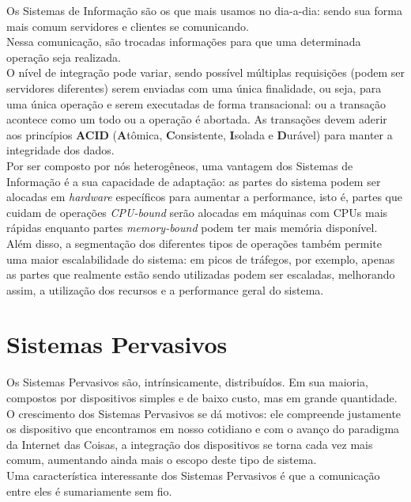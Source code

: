 \documentclass{article}
\begin{document}
Os Sistemas de Informação são os que mais usamos no dia-a-dia: sendo sua forma mais comum servidores e clientes se comunicando.\\
Nessa comunicação, são trocadas informações para que uma determinada operação seja realizada.\\
O nível de integração pode variar, sendo possível múltiplas requisições (podem ser servidores diferentes) serem enviadas com uma única finalidade, ou seja, para uma única operação e serem executadas de forma transacional: ou a transação acontece como um todo ou a operação é abortada.
As transações devem aderir aos princípios \textbf{ACID} (\textbf{A}tômica, \textbf{C}onsistente, \textbf{I}solada e \textbf{D}urável) para manter a integridade dos dados.\\
Por ser composto por nós heterogêneos, uma vantagem dos Sistemas de Informação é a sua capacidade de adaptação: as partes do sistema podem ser alocadas em \textit{hardware} específicos para aumentar a performance, isto é, partes que cuidam de operações \textit{CPU-bound} serão alocadas em máquinas com CPUs mais rápidas enquanto partes \textit{memory-bound} podem ter mais memória disponível. Além disso, a segmentação dos diferentes tipos de operações também permite uma maior escalabilidade do sistema: em picos de tráfegos, por exemplo, apenas as partes que realmente estão sendo utilizadas podem ser escaladas, melhorando assim, a utilização dos recursos e a performance geral do sistema.

\section{Sistemas Pervasivos}

Os Sistemas Pervasivos são, intrínsicamente, distribuídos. Em sua maioria, compostos por dispositivos simples e de baixo custo, mas em grande quantidade.\\
O crescimento dos Sistemas Pervasivos se dá motivos: ele compreende justamente os dispositivo que encontramos em nosso cotidiano e com o avanço do paradigma da Internet das Coisas, a integração dos dispositivos se torna cada vez mais comum, aumentando ainda mais o escopo deste tipo de sistema.\\
Uma característica interessante dos Sistemas Pervasivos é que a comunicação entre eles é sumariamente sem fio.
\end{document}
